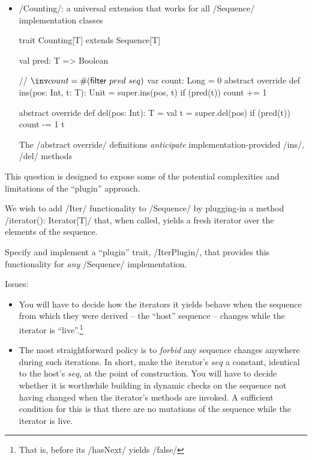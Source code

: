 \documentclass{ip3}
\begin{document}
\begin{foil}
\begin{itemize}
    \item \sc/Counting/: a universal extension that works for all \sc/Sequence/ implementation classes 
    \begin{code}
    
    trait Counting[T] extends  Sequence[T] {
        val pred: T => Boolean
        
        // $\inv count = \# (\mathsf{filter}~pred~seq)$
        var count: Long = 0
        abstract override def ins(pos: Int, t: T): Unit =
        { super.ins(pos, t)
          if (pred(t)) { count += 1 }
        }
        
        abstract override def del(pos: Int): T =
        { val t = super.del(pos)
          if (pred(t)) { count -= 1 }
          t
        }                      
      }
    \end{code}
    \vitem The \sc/abstract override/ definitions \textit{anticipate} 
           implementation-provided \sc/ins/, \sc/del/ methods
    
    
\end{itemize}
\begin{exercise} This question is designed to
expose some of the potential complexities and limitations of the ``plugin''
approach.

We wish to add \sc/Iter/ functionality to \sc/Sequence/ by plugging-in a
method \sc/iterator(): Iterator[T]/ that, when called,  yields a fresh
iterator over the elements of the sequence.

Specify and implement a ``plugin'' trait, \sc/IterPlugin/, that provides
this functionality for \textit{any} \sc/Sequence/ implementation.

Issues:
\begin{itemize}
\item You will have to decide how the iterators it yields behave when the
sequence from which they were derived -- the ``host'' sequence -- changes
while the iterator is ``live''.\footnote{That is, before its \sc/hasNext/
yields \sc/false/}


\item The most straightforward policy is to \textit{forbid} any sequence changes
anywhere during such iterations. In short, make the iterator's $seq$ a
constant, identical to the host's $seq$, at the point of construction. You
will have to decide whether it is worthwhile building in dynamic checks on
the sequence not having changed when the iterator's methods are invoked. A
sufficient condition for this is that there are no mutations of the
sequence while the iterator is live.


\end{itemize}
\end{exercise}
\end{foil}
\end{document}
